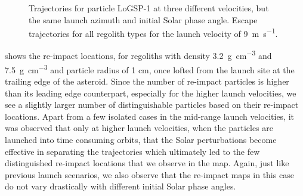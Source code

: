 \begin{figure}[htb]
\caption{\protect{} Trajectories for particle LoGSP-1 at three different velocities, but the same launch azimuth and initial Solar phase angle. \protect{} Escape trajectories for all regolith types for the launch velocity of \SI{9}{\metre\per\second}.}
\label{fig:trailingEdge_reimpact_specailcase_traj}
\end{figure}
\FloatBarrier
 shows the re-impact locations, for regoliths with density \SI{3.2}{\gram\per\centi\metre\cubed} and \SI{7.5}{\gram\per\centi\metre\cubed} and particle radius of 1 cm, once lofted from the launch site at the trailing edge of the asteroid. Since the number of re-impact particles is higher than its leading edge counterpart, especially for the higher launch velocities, we see a slightly larger number of distinguishable particles based on their re-impact locations. Apart from a few isolated cases in the mid-range launch velocities, it was observed that only at higher launch velocities, when the particles are launched into time consuming orbits, that the Solar perturbations become effective in separating the trajectories which ultimately led to the few distinguished re-impact locations that we observe in the map. Again, just like previous launch scenarios, we also observe that the re-impact maps in this case do not vary drastically with different initial Solar phase angles.
